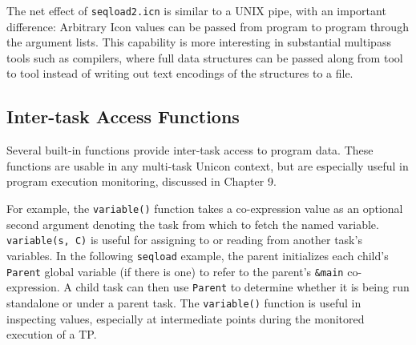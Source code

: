 
The net effect of {\tt seqload2.icn} is similar to a UNIX pipe, with
an important difference: Arbitrary Icon values can be passed from
program to program through the argument lists.
This capability is more interesting in substantial multipass tools
such as compilers, where full data structures can be passed along from
tool to tool instead of writing out text encodings of the structures
to a file.


\subsection*{Inter-task Access Functions}

Several built-in functions
provide inter-task access to program data.  These functions
are usable in any multi-task Unicon context, but are especially
useful in program execution monitoring, discussed in Chapter 9.

For example, the
{\tt variable()} function takes a co-expression value as an
optional second argument denoting the task from which to fetch the named
variable. {\tt variable(s, C)} is
useful for assigning to or reading from another task's
variables. In the following {\tt seqload} example, the
parent initializes each child's {\tt Parent} global
variable (if there is one) to refer to the parent's {\tt \&main}
co-expression.  A child task can then use {\tt Parent} to determine
whether it is being run standalone or under a parent task.
The {\tt variable()} function is
useful in inspecting values, especially at intermediate points during
the monitored execution of a TP.



